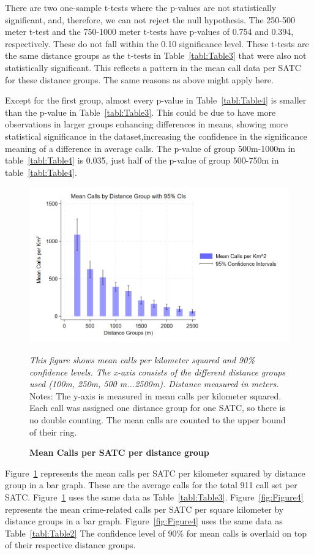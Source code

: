 \documentclass[12pt]{article}
\begin{document}
There are two one-sample t-tests where the p-values are not statistically significant, and, therefore, we can not reject the null hypothesis. The 250-500 meter t-test and the 750-1000 meter t-tests have p-values of 0.754 and 0.394, respectively. These do not fall within the 0.10 significance level. These t-tests are the same distance groups as the t-tests in Table~\ref{tabl:Table3} that were also not statistically significant. This reflects a pattern in the mean call data per SATC for these distance groups. The same reasons as above might apply here.

Except for the first group, almost every p-value in Table~\ref{tabl:Table4} is smaller than the p-value in Table~\ref{tabl:Table3}. This could be due to have more observations in larger groups enhancing differences in means, showing more statistical significance in the dataset,increasing the confidence in the significance meaning of a difference in average calls. The p-value of group 500m-1000m in table~\ref{tabl:Table4} is 0.035, just half of the p-value of group 500-750m in table~\ref{tabl:Table4}. 

\begin{figure}[htbp]
    \centering
\includegraphics[width=0.75\linewidth]{Reproducibility Package/Downloaded_calls/Visual_Graphics_Downloaded_calls/250_CI_Graph.png}
    \caption{\textbf{Mean Calls per SATC per distance group}}
     \label{fig:Figure3}
     \textit{This figure shows mean calls per kilometer squared and 90\% confidence levels. The x-axis consists of the different distance groups used (100m, 250m, 500 m...2500m). Distance measured in meters.}
    \centering\small{Notes: The y-axis is measured in mean calls per kilometer squared. Each call was assigned one distance group for one SATC, so there is no double counting. The mean calls are counted to the upper bound of their ring.}
\end{figure}

Figure~\ref{fig:Figure3} represents the mean calls per SATC per kilometer squared by distance group in a bar graph. These are the average calls for the total 911 call set per SATC. Figure~\ref{fig:Figure3} uses the same data as Table~\ref{tabl:Table3}. Figure~\ref{fig:Figure4} represents the mean crime-related calls per SATC per square kilometer by distance groups in a bar graph. Figure~\ref{fig:Figure4} uses the same data as Table~\ref{tabl:Table2} The confidence level of 90\% for mean calls is overlaid on top of their respective distance groups. 
\end{document}
